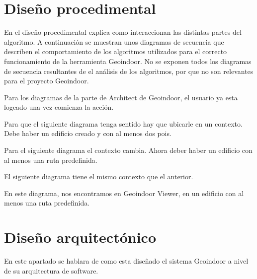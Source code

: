 \section{Diseño procedimental}

En el diseño procedimental explica como interaccionan las distintas partes del algoritmo.
A continuación se muestran unos diagramas de secuencia que describen el comportamiento de los algoritmos utilizados para el correcto funcionamiento de la herramienta Geoindoor. No se exponen todos los diagramas de secuencia resultantes de el análisis de los algoritmos, por que no son relevantes para el proyecto Geoindoor.

Para los diagramas de la parte de Architect de Geoindoor, el usuario ya esta logeado una vez comienza la acción.
\newpage
{}

Para que el siguiente diagrama tenga sentido hay que ubicarle en un contexto. Debe haber un edificio creado y con al menos dos pois.
\newpage
{}

Para el siguiente diagrama el contexto cambia. Ahora deber haber un edificio con al menos una ruta predefinida.


\newpage
El siguiente diagrama tiene el mismo contexto que el anterior.


\newpage
En este diagrama, nos encontramos en Geoindoor Viewer, en un edificio con al menos una ruta predefinida.

 
\section{Diseño arquitectónico}

En este apartado se hablara de como esta diseñado el sistema Geoindoor a nivel de su arquitectura de software.

